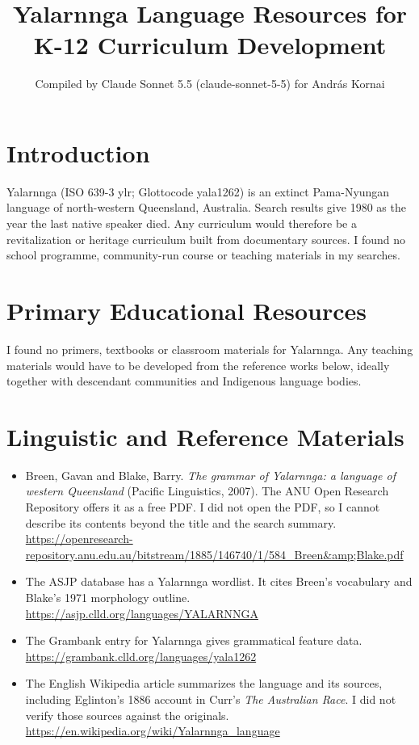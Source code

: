 \documentclass[12pt]{article}
\title{Yalarnnga Language Resources for K-12 Curriculum Development}
\author{Compiled by Claude Sonnet 5.5 (claude-sonnet-5-5) for Andr\'as Kornai}
\date{}
\begin{document}
\maketitle

\section{Introduction}
Yalarnnga (ISO 639-3 ylr; Glottocode yala1262) is an extinct Pama-Nyungan language of north-western Queensland, Australia. Search results give 1980 as the year the last native speaker died. Any curriculum would therefore be a revitalization or heritage curriculum built from documentary sources. I found no school programme, community-run course or teaching materials in my searches.

\section{Primary Educational Resources}
I found no primers, textbooks or classroom materials for Yalarnnga. Any teaching materials would have to be developed from the reference works below, ideally together with descendant communities and Indigenous language bodies.

\section{Linguistic and Reference Materials}
\begin{itemize}
\item Breen, Gavan and Blake, Barry. \emph{The grammar of Yalarnnga: a language of western Queensland} (Pacific Linguistics, 2007). The ANU Open Research Repository offers it as a free PDF. I did not open the PDF, so I cannot describe its contents beyond the title and the search summary. \url{https://openresearch-repository.anu.edu.au/bitstream/1885/146740/1/584_Breen&amp;Blake.pdf}
\item The ASJP database has a Yalarnnga wordlist. It cites Breen's vocabulary and Blake's 1971 morphology outline. \url{https://asjp.clld.org/languages/YALARNNGA}
\item The Grambank entry for Yalarnnga gives grammatical feature data. \url{https://grambank.clld.org/languages/yala1262}
\item The English Wikipedia article summarizes the language and its sources, including Eglinton's 1886 account in Curr's \emph{The Australian Race}. I did not verify those sources against the originals. \url{https://en.wikipedia.org/wiki/Yalarnnga_language}
\end{itemize}
\end{document}
